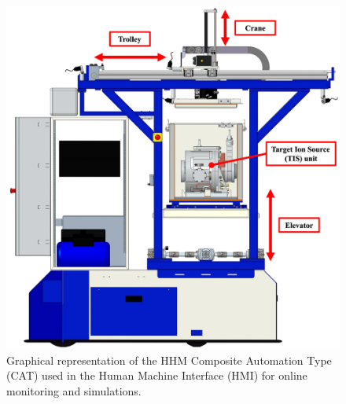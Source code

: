 \begin{bibunit}
\begin{figure}[h!]
    \centering
    \includegraphics[width=\columnwidth]{MX_Papers/Paper4/pictures/lilli08.eps}
    \caption{Graphical representation of the HHM Composite Automation Type (CAT) used in the Human Machine Interface (HMI) for online monitoring and simulations.} 
    \label{fig:hmi}
\end{figure}



\end{bibunit}
